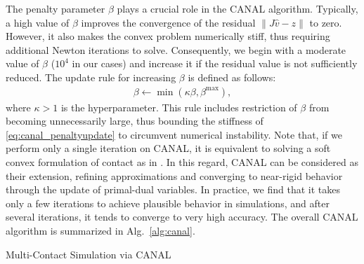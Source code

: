 \documentclass[lettersize,journal]{IEEEtran}
\begin{document}
The penalty parameter $\beta$ plays a crucial role in the CANAL algorithm. Typically, a high value of $\beta$ improves the convergence of the residual $\| J\hat{v} - z \|$ to zero. However, it also makes the convex problem numerically stiff, thus requiring additional Newton iterations to solve. 
Consequently, we begin with a moderate value of $\beta$ ($10^4$ in our cases) and increase it if the residual value is not sufficiently reduced. The update rule for increasing $\beta$ is defined as follows:
\begin{align} \label{eq:canal_penaltyupdate}
\beta \leftarrow \min(\kappa\beta, \beta^{\max}),
\end{align}
where $\kappa > 1$ is the hyperparameter. 
This rule includes restriction of $\beta$ from becoming unnecessarily large, thus bounding the stiffness of \eqref{eq:canal_penaltyupdate} to circumvent numerical instability.
Note that, if we perform only a single iteration on CANAL, it is equivalent to solving a soft convex formulation of contact as in \cite{mujoco,drake}. 
In this regard, CANAL can be considered as their extension, refining approximations and converging to near-rigid behavior through the update of primal-dual variables.
In practice, we find that it takes only a few iterations to achieve plausible behavior in simulations, and after several iterations, it tends to converge to very high accuracy.
The overall CANAL algorithm is summarized in Alg.~\ref{alg:canal}.

\begin{algorithm}[!t]
\SetAlgoLined
\caption{Multi-Contact Simulation via CANAL} 
\label{alg:canal}
\end{algorithm}
\end{document}

